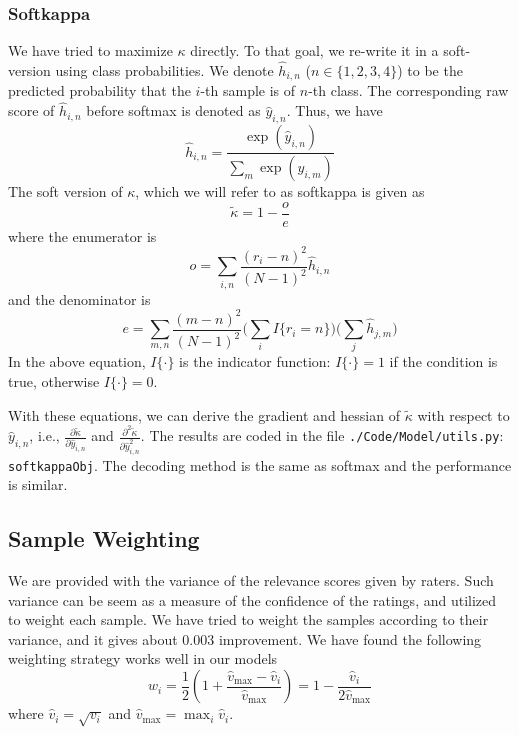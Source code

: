 \documentclass[12pt]{article}
\begin{document}
\subsubsection{Softkappa}
We have tried to maximize $\kappa$ directly. To that goal, we re-write it in a soft-version using class probabilities. We denote $\hat{h}_{i,n}$ ($n\in{\{1,2,3,4\}}$) to be the predicted probability that the $i$-th sample is of $n$-th class. The corresponding raw score of $\hat{h}_{i,n}$ before softmax is denoted as $\hat{y}_{i,n}$. Thus, we have
\begin{equation}
\hat{h}_{i,n}=\frac{\exp(\hat{y}_{i,n})}{\sum_{m}\exp(\hat{y}_{i,m})}
\end{equation}
The soft version of $\kappa$, which we will refer to as softkappa is given as
\begin{equation}
\tilde{\kappa} = 1 - \frac{o}{e}
\end{equation}
where the enumerator is
\begin{equation}
o = \sum_{i,n} \frac{(r_i - n)^2}{(N-1)^2}\hat{h}_{i,n}
\end{equation}
and the denominator is
\begin{equation}
e = \sum_{m,n} \frac{(m - n)^2}{(N-1)^2} \big(\sum_i I\{r_i = n\}\big) \big(\sum_j \hat{h}_{j,m}\big)
\end{equation}
In the above equation, $I\{\cdot\}$ is the indicator function: $I\{\cdot\}=1$ if the condition is true, otherwise $I\{\cdot\}=0$.

With these equations, we can derive the gradient and hessian of $\tilde{\kappa}$ with respect to $\hat{y}_{i,n}$, i.e., $\frac{\partial \tilde{\kappa}}{\partial \hat{y}_{i,n}}$ and $\frac{\partial^2 \tilde{\kappa}}{\partial \hat{y}_{i,n}^2}$. The results are coded in the file \texttt{./Code/Model/utils.py}: \texttt{softkappaObj}. The decoding method is the same as softmax and the performance is similar.

\subsection{Sample Weighting}
We are provided with the variance of the relevance scores given by raters. Such variance can be seem as a measure of the confidence of the ratings, and utilized to weight each sample. We have tried to weight the samples according to their variance, and it gives about 0.003 improvement. We have found the following weighting strategy works well in our models
\begin{equation}
w_i = \frac{1}{2}(1 + \frac{\hat{v}_{\max} - \hat{v}_i}{\hat{v}_{\max}})=1-\frac{\hat{v}_i}{2\hat{v}_{\max}}
\end{equation}
where $\hat{v}_i = \sqrt{v_i}$ and $\hat{v}_{\max} = \max_{i} \hat{v}_i$.
\end{document}

